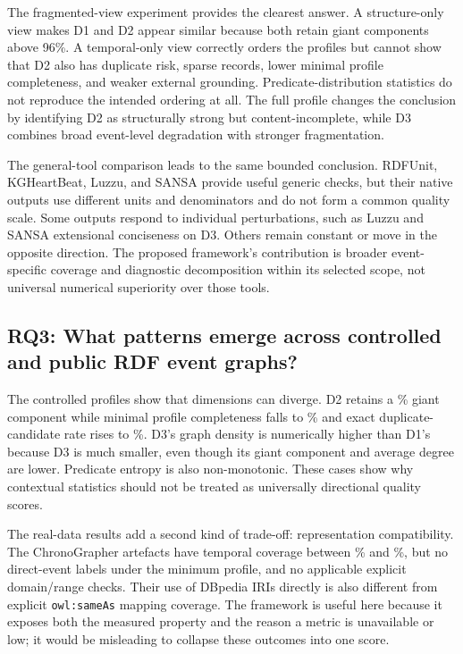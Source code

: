 The fragmented-view experiment provides the clearest answer. A structure-only view makes D1 and D2 appear similar because both retain giant components above 96\%. A temporal-only view correctly orders the profiles but cannot show that D2 also has duplicate risk, sparse records, lower minimal profile completeness, and weaker external grounding. Predicate-distribution statistics do not reproduce the intended ordering at all. The full profile changes the conclusion by identifying D2 as structurally strong but content-incomplete, while D3 combines broad event-level degradation with stronger fragmentation.

The general-tool comparison leads to the same bounded conclusion. RDFUnit, KGHeartBeat, Luzzu, and SANSA provide useful generic checks, but their native outputs use different units and denominators and do not form a common quality scale. Some outputs respond to individual perturbations, such as Luzzu and SANSA extensional conciseness on D3. Others remain constant or move in the opposite direction. The proposed framework's contribution is broader event-specific coverage and diagnostic decomposition within its selected scope, not universal numerical superiority over those tools.

\subsection{RQ3: What patterns emerge across controlled and public RDF event graphs?}

The controlled profiles show that dimensions can diverge. D2 retains a \DTwoGiantPct\% giant component while minimal profile completeness falls to \DTwoCompletenessPct\% and exact duplicate-candidate rate rises to \DTwoDuplicateRatePct\%. D3's graph density is numerically higher than D1's because D3 is much smaller, even though its giant component and average degree are lower. Predicate entropy is also non-monotonic. These cases show why contextual statistics should not be treated as universally directional quality scores.

The real-data results add a second kind of trade-off: representation compatibility. The ChronoGrapher artefacts have temporal coverage between \ChronoGenerationTemporalCoveragePct\% and \ChronoSearchTemporalCoveragePct\%, but no direct-event labels under the minimum profile, and no applicable explicit domain/range checks. Their use of DBpedia IRIs directly is also different from explicit \texttt{owl:sameAs} mapping coverage. The framework is useful here because it exposes both the measured property and the reason a metric is unavailable or low; it would be misleading to collapse these outcomes into one score.

